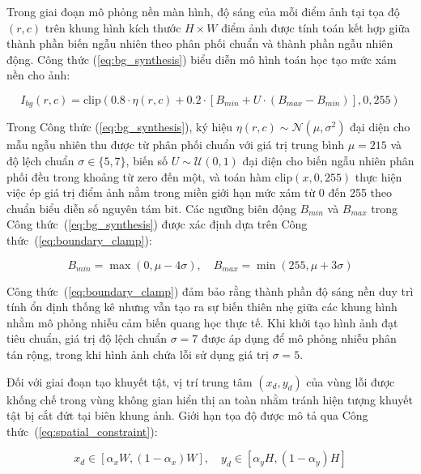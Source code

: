 Trong giai đoạn mô phỏng nền màn hình, độ sáng của mỗi điểm ảnh tại tọa độ $(r, c)$ trên khung hình kích thước $H \times W$ điểm ảnh được tính toán kết hợp giữa thành phần biến ngẫu nhiên theo phân phối chuẩn và thành phần ngẫu nhiên động. Công thức (\ref{eq:bg_synthesis}) biểu diễn mô hình toán học tạo mức xám nền cho ảnh:

\begin{equation}
I_{bg}(r, c) = \text{clip}\left(0.8 \cdot \eta(r, c) + 0.2 \cdot \left[ B_{min} + U \cdot (B_{max} - B_{min}) \right], 0, 255\right)
\label{eq:bg_synthesis}
\end{equation}

Trong Công thức (\ref{eq:bg_synthesis}), ký hiệu $\eta(r, c) \sim \mathcal{N}(\mu, \sigma^2)$ đại diện cho mẫu ngẫu nhiên thu được từ phân phối chuẩn với giá trị trung bình $\mu = 215$ và độ lệch chuẩn $\sigma \in \{5, 7\}$, biến số $U \sim \mathcal{U}(0, 1)$ đại diện cho biến ngẫu nhiên phân phối đều trong khoảng từ zero đến một, và toán hàm $\text{clip}(x, 0, 255)$ thực hiện việc ép giá trị điểm ảnh nằm trong miền giới hạn mức xám từ 0 đến 255 theo chuẩn biểu diễn số nguyên tám bit. Các ngưỡng biên động $B_{min}$ và $B_{max}$ trong Công thức~(\ref{eq:bg_synthesis}) được xác định dựa trên Công thức~(\ref{eq:boundary_clamp}):

\begin{equation}
B_{min} = \max(0, \mu - 4\sigma), \quad B_{max} = \min(255, \mu + 3\sigma)
\label{eq:boundary_clamp}
\end{equation}

Công thức~(\ref{eq:boundary_clamp}) đảm bảo rằng thành phần độ sáng nền duy trì tính ổn định thống kê nhưng vẫn tạo ra sự biến thiên nhẹ giữa các khung hình nhằm mô phỏng nhiễu cảm biến quang học thực tế. Khi khởi tạo hình ảnh đạt tiêu chuẩn, giá trị độ lệch chuẩn $\sigma = 7$ được áp dụng để mô phỏng nhiễu phân tán rộng, trong khi hình ảnh chứa lỗi sử dụng giá trị $\sigma = 5$.

Đối với giai đoạn tạo khuyết tật, vị trí trung tâm $(x_d, y_d)$ của vùng lỗi được khống chế trong vùng không gian hiển thị an toàn nhằm tránh hiện tượng khuyết tật bị cắt đứt tại biên khung ảnh. Giới hạn tọa độ được mô tả qua Công thức~(\ref{eq:spatial_constraint}):

\begin{equation}
x_d \in \left[ \alpha_x W, (1 - \alpha_x) W \right], \quad y_d \in \left[ \alpha_y H, (1 - \alpha_y) H \right]
\label{eq:spatial_constraint}
\end{equation}

